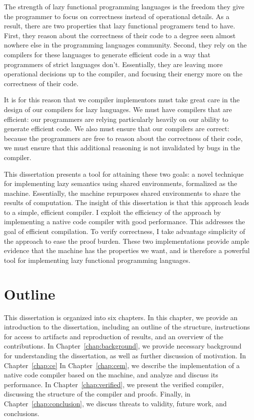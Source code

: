 The strength of lazy functional programming languages is the freedom they
give the programmer to focus on correctness instead of operational details. As a
result, there are two properties that lazy functional programers tend to have.
First, they reason about the correctness of their code to a degree seen almost
nowhere else in the programming languages community. Second, they rely on the
compilers for these languages to generate efficient code in a way that
programmers of strict languages don't. Essentially, they are leaving more
operational decisions up to the compiler, and focusing their energy more on the
correctness of their code. 

It is for this reason that we compiler implementors must take great care in the
design of our compilers for lazy languages. We must have compilers that are
efficient: our programmers are relying particularly heavily on our ability to
generate efficient code. We also must ensure that our compilers are correct:
because the programmers are free to reason about the correctness of their code,
we must ensure that this additional reasoning is not invalidated by bugs in the
compiler. 

This dissertation presents a tool for attaining these two goals: a novel
technique for implementing lazy semantics using shared environments, formalized
as the \ce machine. Essentially, the \ce machine repurposes shared environments
to share the results of computation. The insight of this dissertation is that
this approach leads to a simple, efficient compiler. I exploit the efficiency of
the approach by implementing a native code compiler with good performance. This
addresses the goal of efficient compilation. To verify correctness, I take
advantage simplicity of the approach to ease the proof burden. These two
implementations provide ample evidence that the \ce machine has the properties
we want, and is therefore a powerful tool for implementing lazy functional
programming languages.

\section{Outline}

This dissertation is organized into six chapters. In this chapter, we provide
an introduction to the dissertation, including an outline of the structure,
instructions for access to artifacts and reproduction of results, and an
overview of the contributions. In Chapter~\ref{chap:background}, we provide
necessary background for understanding the dissertation, as well as further
discussion of motivation. In Chapter~\ref{chap:ce}  In Chapter~\ref{chap:cem}, we describe the
implementation of a native code compiler based on the \ce machine, and analyze
and discuss its performance. In Chapter~\ref{chap:verified}, we present the
verified compiler, discussing the structure of the compiler and proofs. Finally,
in Chapter~\ref{chap:conclusion}, we discuss threats to validity, future work,
and conclusions.

